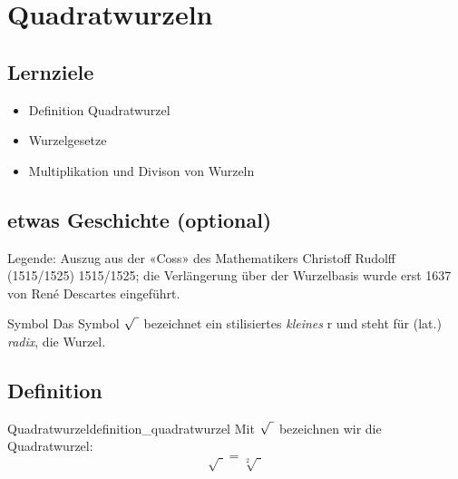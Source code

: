 
\section{Quadratwurzeln}\index{$\sqrt{\mathstrut{}\,}$}

\subsection*{Lernziele}

\begin{itemize}
\item Definition Quadratwurzel
\item Wurzelgesetze
\item Multiplikation und Divison von Wurzeln
\end{itemize}


\newpage
\subsection*{etwas Geschichte (optional)}

\noTRAINER{\vspace{50mm}}



Legende: 
Auszug aus der «Coss» des Mathematikers Christoff
Rudolff\cite{rudolff1515} (1515/1525)  1515/1525; die
Verlängerung über der Wurzelbasis wurde erst 1637 von René Descartes eingeführt.


\begin{bemerkung}{Symbol}{}
Das Symbol $\sqrt{\vphantom{b} \,\,}$
bezeichnet ein stilisiertes {\textit{kleines}} {\huge{r}} und steht für
  (lat.) \textit{radix}, die Wurzel.
\end{bemerkung}

\newpage

\subsection{Definition}
\begin{definition}{Quadratwurzel}{definition_quadratwurzel}
Mit $\sqrt{\vphantom{b} \,\,}$ bezeichnen wir die
Quadratwurzel:
$$\sqrt{\,\,}  = \sqrt[2]{\,\,}$$
\end{definition}


